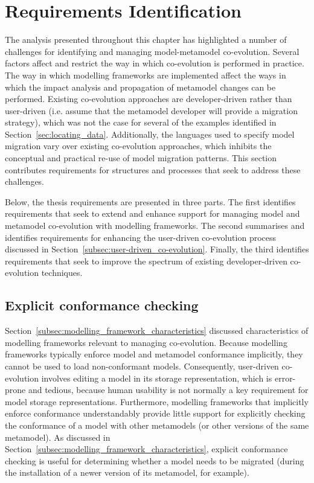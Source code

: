 \section{Requirements Identification}
\label{sec:requirements_identification}

The analysis presented throughout this chapter has highlighted a number of challenges for identifying and managing model-metamodel co-evolution. Several factors affect and restrict the way in which co-evolution is performed in practice. The way in which modelling frameworks are implemented affect the ways in which the impact analysis and propagation of metamodel changes can be performed. Existing co-evolution approaches are developer-driven rather than user-driven (i.e. assume that the metamodel developer will provide a migration strategy), which was not the case for several of the examples identified in Section~\ref{sec:locating_data}. Additionally, the languages used to specify model migration vary over existing co-evolution approaches, which inhibits the conceptual and practical re-use of model migration patterns. This section contributes requirements for structures and processes that seek to address these challenges.

Below, the thesis requirements are presented in three parts. The first identifies requirements that seek to extend and enhance support for managing model and metamodel co-evolution with modelling frameworks. The second summarises and identifies requirements for enhancing the user-driven co-evolution process discussed in Section~\ref{subsec:user-driven_co-evolution}. Finally, the third identifies requirements that seek to improve the spectrum of existing developer-driven co-evolution techniques.


\subsection{Explicit conformance checking}
Section~\ref{subsec:modelling_framework_characteristics} discussed characteristics of modelling frameworks relevant to managing co-evolution. Because modelling frameworks typically enforce model and metamodel conformance implicitly, they cannot be used to load non-conformant models. Consequently, user-driven co-evolution involves editing a model in its storage representation, which is error-prone and tedious, because human usability is not normally a key requirement for model storage representations. Furthermore, modelling frameworks that implicitly enforce conformance understandably provide little support for explicitly checking the conformance of a model with other metamodels (or other versions of the same metamodel). As discussed in Section~\ref{subsec:modelling_framework_characteristics}, explicit conformance checking is useful for determining whether a model needs to be migrated (during the installation of a newer version of its metamodel, for example).

